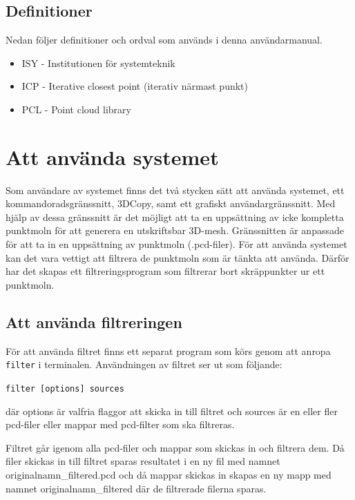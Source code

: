 \documentclass[a4paper,titlepage,12pt]{article}
\begin{document}
	\subsection{Definitioner}
		Nedan följer definitioner och ordval som används i denna användarmanual.
		
		\begin{itemize}
			\item ISY - Institutionen för systemteknik
			\item ICP - Iterative closest point (iterativ närmast punkt)
			\item PCL - Point cloud library
		\end{itemize}
    
\newpage  

\section{Att använda systemet}
	Som användare av systemet finns det två stycken sätt att använda systemet, ett kommandoradsgränssnitt, 3DCopy, samt ett grafiskt användargränssnitt. Med hjälp av dessa gränssnitt är det möjligt att ta en uppsättning av icke kompletta punktmoln för att generera en utskriftsbar 3D-mesh. Gränssnitten är anpassade för att ta in en uppsättning av punktmoln (.pcd-filer). För att använda systemet kan det vara vettigt att filtrera de punktmoln som är tänkta att använda. Därför har det skapas ett filtreringsprogram som filtrerar bort skräppunkter ur ett punktmoln.
	
	\subsection{Att använda filtreringen}
	För att använda filtret finns ett separat program som körs genom att anropa \texttt{filter} i terminalen. Användningen av filtret ser ut som följande:
	
	\texttt{filter [options] sources}
	
	där options är valfria flaggor att skicka in till filtret och sources är en eller fler pcd-filer eller mappar med pcd-filter som ska filtreras.
	
	Filtret går igenom alla pcd-filer och mappar som skickas in och filtrera dem. Då filer skickas in till filtret sparas resultatet i en ny fil med namnet originalnamn\_filtered.pcd och då mappar skickas in skapas en ny mapp med namnet originalnamn\_filtered där de filtrerade filerna sparas.
	
\end{document}
